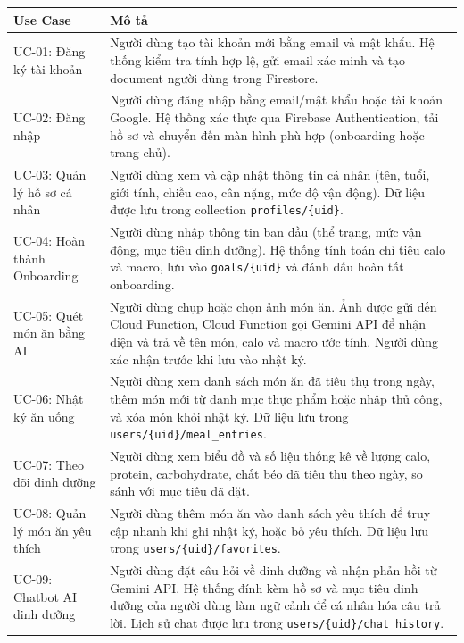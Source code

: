 \begin{longtable}{|p{3cm}|p{11cm}|}
    \hline
    \textbf{Use Case} & \textbf{Mô tả} \\
    \hline
    \endhead
    \hline
    \endfoot
    UC-01: Đăng ký tài khoản & Người dùng tạo tài khoản mới bằng email và mật khẩu. Hệ thống kiểm tra tính hợp lệ, gửi email xác minh và tạo document người dùng trong Firestore. \\
    \hline
    UC-02: Đăng nhập & Người dùng đăng nhập bằng email/mật khẩu hoặc tài khoản Google. Hệ thống xác thực qua Firebase Authentication, tải hồ sơ và chuyển đến màn hình phù hợp (onboarding hoặc trang chủ). \\
    \hline
    UC-03: Quản lý hồ sơ cá nhân & Người dùng xem và cập nhật thông tin cá nhân (tên, tuổi, giới tính, chiều cao, cân nặng, mức độ vận động). Dữ liệu được lưu trong collection \texttt{profiles/\{uid\}}. \\
    \hline
    UC-04: Hoàn thành Onboarding & Người dùng nhập thông tin ban đầu (thể trạng, mức vận động, mục tiêu dinh dưỡng). Hệ thống tính toán chỉ tiêu calo và macro, lưu vào \texttt{goals/\{uid\}} và đánh dấu hoàn tất onboarding. \\
    \hline
    UC-05: Quét món ăn bằng AI & Người dùng chụp hoặc chọn ảnh món ăn. Ảnh được gửi đến Cloud Function, Cloud Function gọi Gemini API để nhận diện và trả về tên món, calo và macro ước tính. Người dùng xác nhận trước khi lưu vào nhật ký. \\
    \hline
    UC-06: Nhật ký ăn uống & Người dùng xem danh sách món ăn đã tiêu thụ trong ngày, thêm món mới từ danh mục thực phẩm hoặc nhập thủ công, và xóa món khỏi nhật ký. Dữ liệu lưu trong \texttt{users/\{uid\}/meal\_entries}. \\
    \hline
    UC-07: Theo dõi dinh dưỡng & Người dùng xem biểu đồ và số liệu thống kê về lượng calo, protein, carbohydrate, chất béo đã tiêu thụ theo ngày, so sánh với mục tiêu đã đặt. \\
    \hline
    UC-08: Quản lý món ăn yêu thích & Người dùng thêm món ăn vào danh sách yêu thích để truy cập nhanh khi ghi nhật ký, hoặc bỏ yêu thích. Dữ liệu lưu trong \texttt{users/\{uid\}/favorites}. \\
    \hline
    UC-09: Chatbot AI dinh dưỡng & Người dùng đặt câu hỏi về dinh dưỡng và nhận phản hồi từ Gemini API. Hệ thống đính kèm hồ sơ và mục tiêu dinh dưỡng của người dùng làm ngữ cảnh để cá nhân hóa câu trả lời. Lịch sử chat được lưu trong \texttt{users/\{uid\}/chat\_history}. \\
    \hline

\end{longtable}
